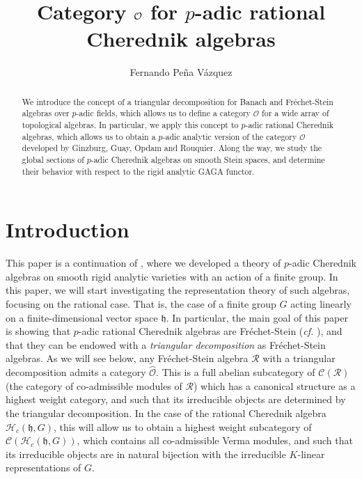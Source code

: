 \documentclass{amsart}
\title{\texorpdfstring{Category $\OX$ for $p$-adic rational Cherednik algebras}{}}
\author{Fernando Peña Vázquez}
\newcommand{\OX}{\mathcal{O}}
\begin{document}
\begin{abstract}
We introduce the concept of a triangular decomposition for  Banach and Fréchet-Stein algebras over $p$-adic fields, which allows us to define a category $\OX$ for a wide array of topological algebras. In particular, we apply this concept to $p$-adic rational Cherednik algebras, which allows us to obtain a $p$-adic analytic version of the category $\OX$ developed by Ginzburg, Guay, Opdam and Rouquier. Along the way, we study the global sections of $p$-adic Cherednik algebras on smooth Stein spaces, and determine their behavior with respect to the rigid analytic GAGA functor.
\end{abstract}
\maketitle

\tableofcontents
\section{Introduction}

This paper is a continuation of \cite{p-adicCheralg}, where we developed a theory of $p$-adic Cherednik algebras on smooth rigid analytic varieties with an action of a finite group. In this paper, we will start investigating the representation theory of such algebras, focusing on the rational case. That is, the case of a finite group $G$ acting linearly on a finite-dimensional vector space $\mathfrak{h}$. In particular, the main goal of this paper is showing that $p$-adic rational Cherednik algebras are Fréchet-Stein (\emph{cf.} \cite[Section 3]{schneider2002algebras}), and that they can be endowed with a \emph{triangular decomposition} as Fréchet-Stein algebras. As we will see below, any 
Fréchet-Stein algebra $\mathscr{R}$ with a triangular decomposition admits a category $\wideparen{\OX}$. This is a full abelian subcategory of $\mathcal{C}(\mathscr{R})$  (the category of co-admissible modules of $\mathscr{R}$)  which has a canonical structure as a highest weight category, and such that its irreducible objects are determined by the triangular decomposition. In the case of the rational Cherednik algebra $\mathcal{H}_c(\mathfrak{h},G)$, this will allow us to obtain a highest weight subcategory  of $\mathcal{C}(\mathcal{H}_c(\mathfrak{h},G))$, which contains all co-admissible Verma modules, and such that its irreducible objects are in natural bijection with the irreducible $K$-linear representations of $G$.\bigskip
\end{document}
